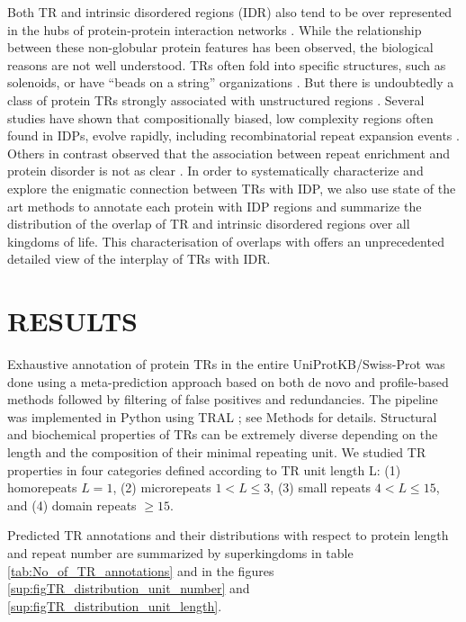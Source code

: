 \documentclass[a4,center,fleqn]{NAR}
\begin{document}
Both TR and intrinsic disordered regions (IDR) also tend to be over represented in the hubs of protein-protein interaction networks \cite{Ekman2006}. While the relationship between these non-globular protein features has been observed, the biological reasons are not well understood. 
TRs often fold into specific structures, such as solenoids, or have “beads on a string” organizations \cite{Kajava2012}. But there is undoubtedly a class of protein TRs strongly associated with unstructured regions \cite{Jorda2010, Szalkowski2013}. Several studies have shown that compositionally biased, low complexity regions often found in IDPs, evolve rapidly, including recombinatorial repeat expansion events \cite{Tompa2003, Simon2009}. Others in contrast observed that the association between repeat enrichment and protein disorder is not as clear \cite{Light2013}.
In order to systematically characterize and explore the enigmatic connection between TRs with IDP, we also use state of the art methods to annotate each protein with IDP regions and summarize the distribution of the overlap of TR and intrinsic disordered regions over all kingdoms of life. 
This characterisation of overlaps with offers an unprecedented detailed view of the interplay of TRs with IDR. 

\section{RESULTS}
Exhaustive annotation of protein TRs in the entire UniProtKB/Swiss-Prot was done using a meta-prediction approach based on both de novo and profile-based methods followed by filtering of false positives and redundancies. The pipeline was implemented in Python using TRAL \citep{Schaper2015}; see Methods for details. Structural and biochemical properties of TRs can be extremely diverse depending on the length and the composition of their minimal repeating unit. We studied TR properties in four categories defined according to TR unit length L:
(1) homorepeats $L=1$, (2) microrepeats $1 < L \leq 3$, (3) small repeats $4<L\leq15$, and (4) domain repeats $\geq 15$. 

Predicted TR annotations and their distributions with respect to protein length and repeat number are summarized by superkingdoms \cite{Nasir2012} in table \ref{tab:No_of_TR_annotations} and in the figures \ref{sup:figTR_distribution_unit_number} and \ref{sup:figTR_distribution_unit_length}.
\end{document}
